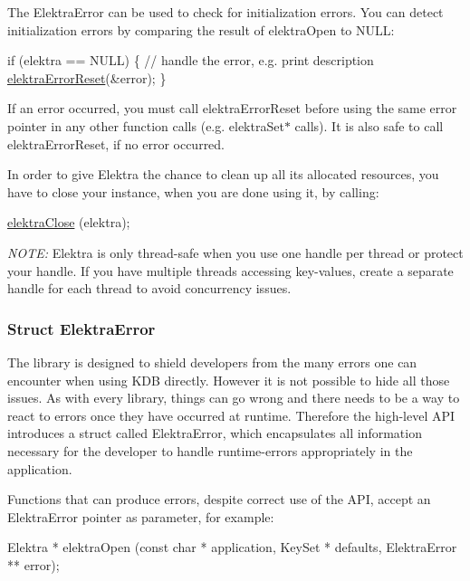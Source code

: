 The {\ttfamily Elektra\+Error} can be used to check for initialization errors. You can detect initialization errors by comparing the result of {\ttfamily elektra\+Open} to N\+U\+LL\+:


\begin{DoxyCode}
\textcolor{keywordflow}{if} (elektra == NULL)
\{
  \textcolor{comment}{// handle the error, e.g. print description}
  \hyperlink{group__highlevel_ga591f7ed4b57a341928bf7bb3d7adb693}{elektraErrorReset}(&error);
\}
\end{DoxyCode}


If an error occurred, you must call {\ttfamily elektra\+Error\+Reset} before using the same error pointer in any other function calls (e.\+g. {\ttfamily elektra\+Set$\ast$} calls). It is also safe to call {\ttfamily elektra\+Error\+Reset}, if no error occurred.

In order to give Elektra the chance to clean up all its allocated resources, you have to close your instance, when you are done using it, by calling\+:


\begin{DoxyCode}
\hyperlink{group__highlevel_ga9b688b7250e5f9d8ea6701cc2cc269af}{elektraClose} (elektra);
\end{DoxyCode}


{\itshape N\+O\+TE\+:} Elektra is only thread-\/safe when you use one handle per thread or protect your handle. If you have multiple threads accessing key-\/values, create a separate handle for each thread to avoid concurrency issues.

\subsubsection*{Struct {\ttfamily Elektra\+Error}}

The library is designed to shield developers from the many errors one can encounter when using K\+DB directly. However it is not possible to hide all those issues. As with every library, things can go wrong and there needs to be a way to react to errors once they have occurred at runtime. Therefore the high-\/level A\+PI introduces a struct called {\ttfamily Elektra\+Error}, which encapsulates all information necessary for the developer to handle runtime-\/errors appropriately in the application.

Functions that can produce errors, despite correct use of the A\+PI, accept an {\ttfamily Elektra\+Error} pointer as parameter, for example\+:


\begin{DoxyCode}
Elektra * elektraOpen (\textcolor{keyword}{const} \textcolor{keywordtype}{char} * application, KeySet * defaults, ElektraError ** error);
\end{DoxyCode}


